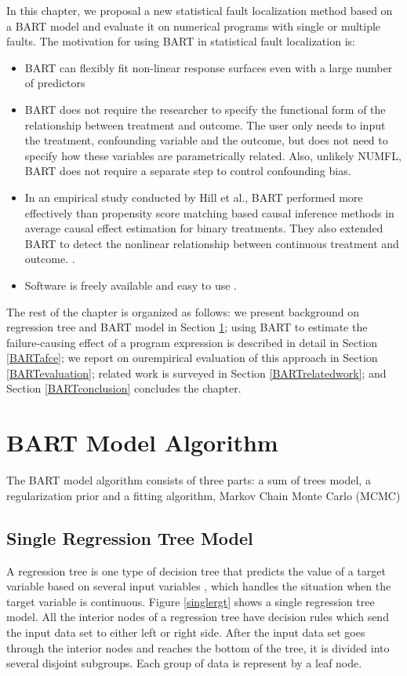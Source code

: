 In this chapter, we proposal a new statistical fault localization method based on a BART model and evaluate it on numerical programs with single or multiple faults. The motivation for using BART in statistical fault localization is:
\vspace{-0.2cm}
\begin{itemize}
\item BART can flexibly fit non-linear response surfaces even with a large number of predictors
\item BART does not require the researcher to specify the functional form of the relationship between treatment and outcome. The user only needs to input the treatment, confounding variable and the outcome, but does not need to specify how these variables are parametrically related. Also, unlikely NUMFL, BART does not require a separate step to control confounding bias.
\item In an empirical study conducted by Hill et al., BART performed more effectively than propensity score matching based causal inference methods in average causal effect estimation for binary treatments. They also extended BART to detect the nonlinear relationship between continuous treatment and outcome. \cite{hill2012bayesian, hill2013assessing}.
\item Software is freely available and easy to use \cite{BARTMachine}.
\end{itemize}

The rest of the chapter is organized as follows: we present background on regression tree and BART model in Section \ref{BARTbg}; using BART to estimate the failure-causing effect of a program expression is described in detail in Section \ref{BARTafce};  we report on ourempirical evaluation of this approach in Section \ref{BARTevaluation}; related work is surveyed in Section \ref{BARTrelatedwork}; and Section \ref{BARTconclusion} concludes the chapter.

\section{BART Model Algorithm}\label{BARTbg}%
The BART model algorithm consists of three parts: a sum of trees model, a regularization prior and a fitting algorithm, Markov Chain Monte Carlo (MCMC)
\subsection{Single Regression Tree Model}
A regression tree is one type of decision tree that predicts the value of a target variable based on several input variables \cite{loh2011classification}, which handles the situation when the target variable is continuous. Figure \ref{singlergt} shows a single regression tree model. All the interior nodes of a regression tree have decision rules which send the input data set to either left or right side. After the input data set goes through the interior nodes and reaches the bottom of the tree, it is divided into several disjoint subgroups. Each group of data is represent by a leaf node.

